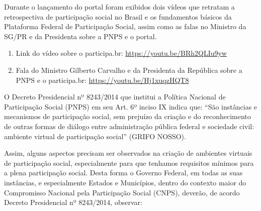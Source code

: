 \documentclass{article}
\begin{document}
Durante o lançamento do portal foram exibidos dois vídeos que retratam a
retrospectiva de participação social no Brasil e os fundamentos básicos da
Plataforma Federal de Participação Social, assim como as falas no Ministro da
SG/PR e da Presidenta sobre a PNPS e o portal.

\begin{enumerate}
  \item Link do vídeo sobre o participa.br: \url{https://youtu.be/BRh2QLIu9yw}
  \item Fala do Ministro Gilberto Carvalho e da Presidenta da República sobre a PNPS e o participa.br: \url{https://youtu.be/Hj1xuqzHQT8}
\end{enumerate}

O Decreto Presidencial nº 8243/2014 que institui a Política Nacional de
Participação Social (PNPS) em seu Art. 6º inciso IX indica que: ``São instâncias
e mecanismos de participação social, sem prejuízo da criação e do
reconhecimento de outras formas de diálogo entre administração pública federal
e sociedade civil: ambiente virtual de participação social'' (GRIFO NOSSO).

Assim, alguns aspectos precisam ser observados na criação de ambientes virtuais
de participação social, especialmente para que tenhamos requisitos mínimos para
a plena participação social. Desta forma o Governo Federal, em todas as suas
instâncias, e especialmente Estados e Municípios, dentro do contexto maior do
Compromisso Nacional pela Participação Social (CNPS), deverão, de acordo
Decreto Presidencial nº 8243/2014, observar:
\end{document}
